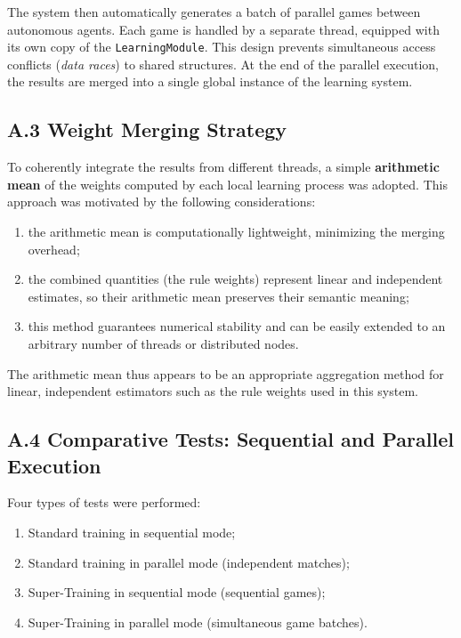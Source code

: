 \documentclass[12pt,a4paper]{article}
\begin{document}
The system then automatically generates a batch of parallel games between autonomous agents.  
Each game is handled by a separate thread, equipped with its own copy of the \texttt{LearningModule}.  
This design prevents simultaneous access conflicts (\textit{data races}) to shared structures.  
At the end of the parallel execution, the results are merged into a single global instance of the learning system.

\subsection*{A.3 Weight Merging Strategy}

To coherently integrate the results from different threads, a simple \textbf{arithmetic mean} of the weights computed by each local learning process was adopted.  
This approach was motivated by the following considerations:
\begin{enumerate}
  \item the arithmetic mean is computationally lightweight, minimizing the merging overhead;
  \item the combined quantities (the rule weights) represent linear and independent estimates, so their arithmetic mean preserves their semantic meaning;
  \item this method guarantees numerical stability and can be easily extended to an arbitrary number of threads or distributed nodes.
\end{enumerate}
The arithmetic mean thus appears to be an appropriate aggregation method for linear, independent estimators such as the rule weights used in this system.

\subsection*{A.4 Comparative Tests: Sequential and Parallel Execution}

Four types of tests were performed:
\begin{enumerate}[label=\alph*)]
  \item Standard training in sequential mode;
  \item Standard training in parallel mode (independent matches);
  \item Super-Training in sequential mode (sequential games);
  \item Super-Training in parallel mode (simultaneous game batches).
\end{enumerate}
\end{document}
